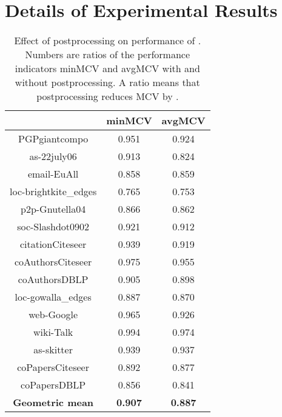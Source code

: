 \documentclass[pdftex]{llncs}
\numberwithin{equation}{section}
\numberwithin{example}{section}
\numberwithin{table}{section}
\begin{document}
\section{Details of Experimental Results}
\label{sec:exp-apx}



\begin{table}[tb]
  \caption{Effect of postprocessing on performance of . Numbers are ratios of
    the performance indicators minMCV and avgMCV with and without
    postprocessing. A ratio  means that postprocessing
    reduces MCV by .}
\begin{center}
\begin{tabular}{c | c  c}
                             & minMCV              &  avgMCV               \\\hline \hline
PGPgiantcompo                &  0.951              &   0.924               \\ \hline
as-22july06                  &  0.913              &   0.824               \\ \hline
email-EuAll                  &  0.858              &   0.859               \\ \hline
loc-brightkite\_edges        &  0.765              &   0.753               \\ \hline
p2p-Gnutella04               &  0.866              &   0.862               \\ \hline
soc-Slashdot0902             &  0.921              &   0.912               \\ \hline
citationCiteseer             &  0.939              &   0.919               \\ \hline
coAuthorsCiteseer            &  0.975              &   0.955               \\ \hline 
coAuthorsDBLP                &  0.905              &   0.898               \\ \hline
loc-gowalla\_edges           &  0.887              &   0.870               \\ \hline
web-Google                   &  0.965              &   0.926               \\ \hline
wiki-Talk                    &  0.994              &   0.974               \\ \hline
as-skitter                   &  0.939              &   0.937               \\ \hline
coPapersCiteseer             &  0.892              &   0.877               \\ \hline
coPapersDBLP                 &  0.856              &   0.841               \\ \hline  \hline
\textbf{Geometric mean}	     & \textbf{0.907}      & \textbf{0.887}        \\ \hline
\end{tabular}
\end{center}
\label{tab:PPgainsMCV}
\end{table}
\end{document}

